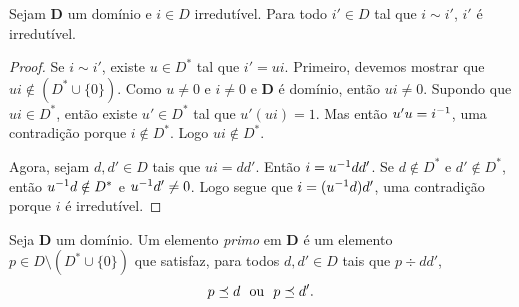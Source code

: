 \begin{prop}
Sejam $\bm D$ um domínio e $i \in D$ irredutível. Para todo $i' \in D$ tal que $i \sim i'$, $i'$ é irredutível.
\end{prop}
\begin{proof}
Se $i \sim i'$, existe $u\in D^*$ tal que $i'=ui$. Primeiro, devemos mostrar que $ui \notin (D^* \cup \{0\})$. Como $u \neq 0$ e $i \neq 0$ e $\bm D$ é domínio, então $ui \neq 0$. Supondo que $ui \in D^*$, então existe $u' \in D^*$ tal que $u'(ui)=1$. Mas então $u'u=i^{-1}$, uma contradição porque $i \notin D^*$. Logo $ui \notin D^*$.
	
Agora, sejam $d,d' \in D$ tais que $ui=dd'$. Então $i=u^{-1} dd'$. Se $d \notin D^*$ e $d' \notin D^*$, então $u^{-1} d \notin D^*$ e $u^{-1} d' \neq 0$. Logo segue que $i=(u^{-1} d)d'$, uma contradição porque $i$ é irredutível.
\end{proof}

\begin{defi}
Seja $\bm D$ um domínio. Um elemento \emph{primo} em $\bm D$ é um elemento $p \in D\setminus (D^* \cup \{0\})$ que satisfaz, para todos $d,d' \in D$ tais que $p \div dd'$,
		\begin{equation*}
		p \preceq d \text{\ \ ou\ \ } p \preceq d'.
		\end{equation*}
\end{defi}

